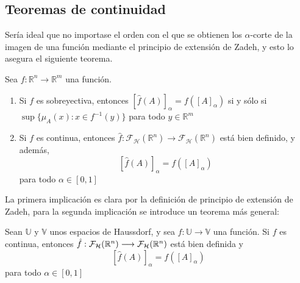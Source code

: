   \subsection{Teoremas de continuidad}
  Sería ideal que no importase el orden con el que se obtienen los $\alpha$-corte de la imagen de una función mediante el principio de extensión de Zadeh, y esto lo asegura el siguiente teorema.

  \begin{teorema}
  	\label{teorema:contfuzzy}
    Sea $f : \mathbb{R}^n \longrightarrow \mathbb{R}^m$ una función.
    \begin{enumerate}
    \item Si $f$ es sobreyectiva, entonces $[\hat{f}(A)]_\alpha = f([A]_\alpha)$ si y sólo si $\sup\{\mu_A(x) : x \in f^{-1}(y)\}$ para todo $y \in \mathbb{R}^m$
    \item Si $f$ es continua, entonces $\hat{f} : \mathcal{F}_\mathcal{H}(\mathbb{R}^n) \longrightarrow \mathcal{F}_\mathcal{H}(\mathbb{R}^n)$ está bien definido, y además,  
      $$[\hat{f}(A)]_\alpha = f([A]_\alpha)$$
      para todo $\alpha \in [0, 1]$
    \end{enumerate}
  \end{teorema}

  La primera implicación es clara por la definición de principio de extensión de Zadeh, para la segunda implicación se introduce un teorema más general:


  \begin{teorema}
    Sean $\mathbb{U}$ y $\mathbb{V}$ unos espacios de Haussdorf, y sea $f: \mathbb{U} \longrightarrow \mathbb{V}$ una función. Si $f$ es continua, entonces  $\hat{f} : \mathcal{F}_\mathcal{H}(\mathbb R^n) \longrightarrow \mathcal{F}_\mathcal{H}(\mathbb R^n)$ está bien definida y $$[\hat{f}(A)]_\alpha = f([A]_\alpha)$$
    para todo $\alpha \in [0, 1]$
  \end{teorema}

